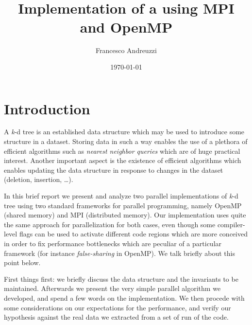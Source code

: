 \documentclass{article}
\title{Implementation of a \kdtree{} using MPI and OpenMP}
\author{Francesco Andreuzzi}
\date{\today}
\newcommand{\kdtree}{\emph{k}-d tree}
\begin{document}
\maketitle



\section{Introduction} \label{sec:intro}
A \kdtree{} is an established data structure which may be used to introduce
some structure in a dataset. Storing data in such a way enables the use of a
plethora of efficient algorithms such as \emph{nearest neighbor queries}
\cite{bentley1975multidimensional} which are of huge practical interest. Another
important aspect is the existence of efficient algorithms which enables updating
the data structure in response to changes in the dataset (deletion, insertion,
\dots).

In this brief report we present and analyze two parallel implementations of
\kdtree{} using two standard frameworks for parallel programming, namely OpenMP
\cite{dagum1998openmp} (shared memory) and MPI \cite{mpi} (distributed memory).
Our implementation uses quite the same approach for parallelization for both
cases, even though some compiler-level flags can be used to activate different
code regions which are more conceived in order to fix performance bottlenecks
which are peculiar of a particular framework (for instance \emph{false-sharing}
in OpenMP). We talk briefly about this point below.

First things first: we briefly discuss the data structure and the invariants to
be maintained. Afterwards we present the very simple parallel algorithm we
developed, and spend a few words on the implementation. We then procede with
some considerations on our expectations for the performance, and verify our
hypothesis against the real data we extracted from a set of run of the code.
\end{document}
